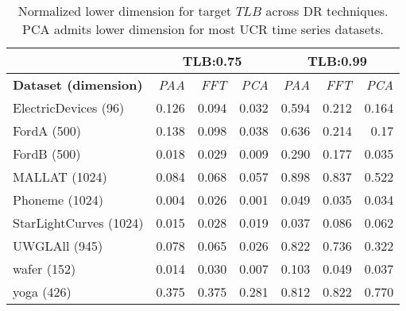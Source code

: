 \begin{table}[]
\centering
\caption{Normalized lower dimension for target $TLB$ across DR techniques. PCA admits lower dimension for most UCR time series datasets.}
\label{tab:kneeded}
\scriptsize
\begin{tabular}{|l|r|r|r|r|r|r|}
\hline
                                  & \multicolumn{3}{c|}{\textbf{TLB:0.75}}     & \multicolumn{3}{c|}{\textbf{TLB:0.99}}     \\ \hline
\textbf{Dataset (dimension)} & \textit{PAA} & \textit{FFT} & \textit{PCA} & \textit{PAA} & \textit{FFT} & \textit{PCA} \\ \hline
ElectricDevices (96)              & 0.126        & 0.094        & 0.032        & 0.594        & 0.212        & 0.164        \\ \hline
FordA (500)                       & 0.138        & 0.098        & 0.038        & 0.636        & 0.214        & 0.17         \\ \hline
FordB (500)                       & 0.018        & 0.029        & 0.009        & 0.290        & 0.177        & 0.035        \\ \hline
MALLAT (1024)                     & 0.084        & 0.068        & 0.057        & 0.898        & 0.837        & 0.522        \\ \hline
Phoneme (1024)                    & 0.004        & 0.026        & 0.001        & 0.049        & 0.035        & 0.034        \\ \hline
StarLightCurves (1024)            & 0.015        & 0.028        & 0.019        & 0.037        & 0.086        & 0.062        \\ \hline
UWGLAll (945)                     & 0.078        & 0.065        & 0.026        & 0.822        & 0.736        & 0.322        \\ \hline
wafer (152)                       & 0.014        & 0.030        & 0.007        & 0.103        & 0.049        & 0.037        \\ \hline
yoga (426)                        & 0.375        & 0.375        & 0.281        & 0.812        & 0.822        & 0.770        \\ \hline

\end{tabular}
\end{table}



